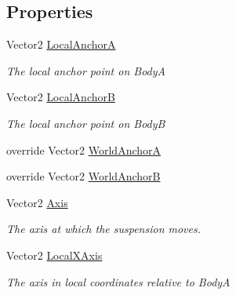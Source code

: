 \subsection*{Properties}
\begin{DoxyCompactItemize}
\item 
Vector2 \hyperlink{class_farseer_physics_1_1_dynamics_1_1_joints_1_1_wheel_joint_a0fac7584a31acbfed90bdfb3ffb2f87a}{Local\+Anchor\+A}
\begin{DoxyCompactList}\small\item\em The local anchor point on Body\+A \end{DoxyCompactList}\item 
Vector2 \hyperlink{class_farseer_physics_1_1_dynamics_1_1_joints_1_1_wheel_joint_a6f269effcc42c8839c43dba59ac90557}{Local\+Anchor\+B}
\begin{DoxyCompactList}\small\item\em The local anchor point on Body\+B \end{DoxyCompactList}\item 
override Vector2 \hyperlink{class_farseer_physics_1_1_dynamics_1_1_joints_1_1_wheel_joint_a6b404d403999f8a84f0afb2bd1da35b6}{World\+Anchor\+A}
\item 
override Vector2 \hyperlink{class_farseer_physics_1_1_dynamics_1_1_joints_1_1_wheel_joint_a47212bee3d4a6f2bd79d80a1b6898fba}{World\+Anchor\+B}
\item 
Vector2 \hyperlink{class_farseer_physics_1_1_dynamics_1_1_joints_1_1_wheel_joint_aa262723cbde47316eb6ba8451ad141d4}{Axis}
\begin{DoxyCompactList}\small\item\em The axis at which the suspension moves. \end{DoxyCompactList}\item 
Vector2 \hyperlink{class_farseer_physics_1_1_dynamics_1_1_joints_1_1_wheel_joint_a0b219be7ca20a841e87f69c66d5e3cc4}{Local\+X\+Axis}
\begin{DoxyCompactList}\small\item\em The axis in local coordinates relative to Body\+A \end{DoxyCompactList}\item 

\end{DoxyCompactItemize}

